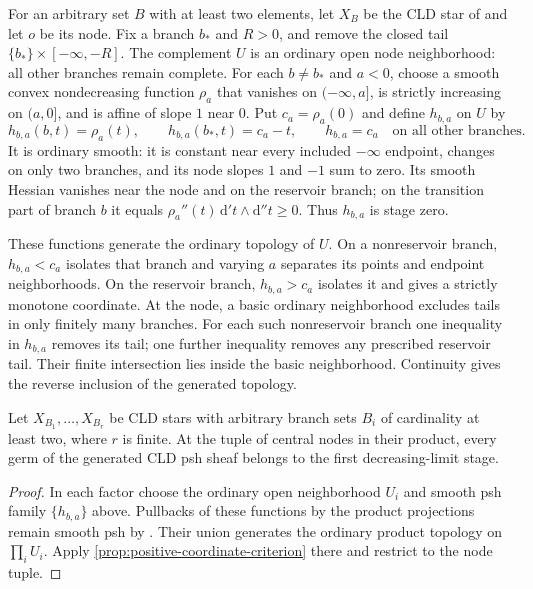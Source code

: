\documentclass[11pt,a4paper]{amsart}
\begin{document}
For an arbitrary set $B$ with at least two elements, let $X_B$ be the CLD star of \cite[\S6.7.3]{CLD12} and let $o$ be its node. Fix a branch $b_*$ and $R>0$, and remove the closed tail $\{b_*\}\times[-\infty,-R]$. The complement $U$ is an ordinary open node neighborhood: all other branches remain complete. For each $b\neq b_*$ and $a<0$, choose a smooth convex nondecreasing function $\rho_a$ that vanishes on $(-\infty,a]$, is strictly increasing on $(a,0]$, and is affine of slope $1$ near $0$. Put $c_a=\rho_a(0)$ and define $h_{b,a}$ on $U$ by
\[
h_{b,a}(b,t)=\rho_a(t),\qquad h_{b,a}(b_*,t)=c_a-t,
\qquad h_{b,a}=c_a\quad\text{on all other branches}.
\]
It is ordinary smooth: it is constant near every included $-\infty$ endpoint, changes on only two branches, and its node slopes $1$ and $-1$ sum to zero. Its smooth Hessian vanishes near the node and on the reservoir branch; on the transition part of branch $b$ it equals $\rho_a''(t)\,\mathrm{d}'t\wedge\mathrm{d}''t\geq0$. Thus $h_{b,a}$ is stage zero.

These functions generate the ordinary topology of $U$. On a nonreservoir branch, $h_{b,a}<c_a$ isolates that branch and varying $a$ separates its points and endpoint neighborhoods. On the reservoir branch, $h_{b,a}>c_a$ isolates it and gives a strictly monotone coordinate. At the node, a basic ordinary neighborhood excludes tails in only finitely many branches. For each such nonreservoir branch one inequality in $h_{b,a}$ removes its tail; one further inequality removes any prescribed reservoir tail. Their finite intersection lies inside the basic neighborhood. Continuity gives the reverse inclusion of the generated topology.

\begin{theorem}
\label{thm:arbitrary-star-products}
Let $X_{B_1},\ldots,X_{B_r}$ be CLD stars with arbitrary branch sets $B_i$ of cardinality at least two, where $r$ is finite. At the tuple of central nodes in their product, every germ of the generated CLD psh sheaf belongs to the first decreasing-limit stage.
\end{theorem}

\begin{proof}
In each factor choose the ordinary open neighborhood $U_i$ and smooth psh family $\{h_{b,a}\}$ above. Pullbacks of these functions by the product projections remain smooth psh by \cite[Proposition~8.1.5 and \S9.1.4]{CLD12}. Their union generates the ordinary product topology on $\prod_i U_i$. Apply \cref{prop:positive-coordinate-criterion} there and restrict to the node tuple.
\end{proof}

\printbibliography
\end{document}
